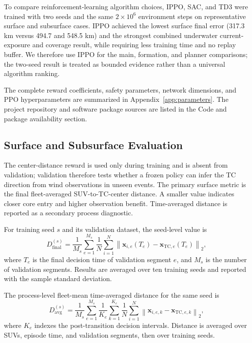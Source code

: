 \documentclass[a4paper,fleqn]{cas-dc}
\begin{document}
To compare reinforcement-learning algorithm choices, IPPO, SAC, and TD3 were
trained with two seeds and the same \(2\times10^6\) environment steps on
representative surface and subsurface cases. IPPO achieved the lowest surface
final error (317.3 km versus 494.7 and 548.5 km) and the strongest combined
underwater current-exposure and coverage result, while requiring less training
time and no replay buffer. We therefore use IPPO for the main, formation, and
planner comparisons; the two-seed result is treated as bounded evidence rather
than a universal algorithm ranking.

The complete reward coefficients, safety parameters, network dimensions, and
PPO hyperparameters are summarized in Appendix~\ref{app:parameters}.
The project repository and software package sources are listed in the Code and
package availability section.

\subsection{Surface and Subsurface Evaluation}
\label{subsec:evaluation}

The center-distance reward is used only during training and is absent from
validation; validation therefore tests whether a frozen policy can infer the
TC direction from wind observations in unseen events. The primary surface
metric is the final fleet-averaged SUV-to-TC-center distance. A smaller value
indicates closer core entry and higher observation benefit. Time-averaged
distance is reported as a secondary process diagnostic.

For training seed \(s\) and its validation dataset, the seed-level value is
\begin{equation}
D_{\mathrm{final}}^{(s)}
=
\frac{1}{M_s}
\sum_{e=1}^{M_s}
\frac{1}{N}
\sum_{i=1}^{N}
\left\|
\mathbf{x}_{i,e}(T_e)
-
\mathbf{x}_{\mathrm{TC},e}(T_e)
\right\|_2,
\label{eq:final_tracking_error}
\end{equation}
where \(T_e\) is the final decision time of validation segment \(e\), and
\(M_s\) is the number of validation segments. Results are averaged over ten
training seeds and reported with the sample standard deviation.

The process-level fleet-mean time-averaged distance for the same seed is
\begin{equation}
D_{\mathrm{avg}}^{(s)}
=
\frac{1}{M_s}
\sum_{e=1}^{M_s}
\frac{1}{K_e}
\sum_{k=1}^{K_e}
\frac{1}{N}
\sum_{i=1}^{N}
\left\|
\mathbf{x}_{i,e,k}
-
\mathbf{x}_{\mathrm{TC},e,k}
\right\|_2,
\label{eq:time_averaged_distance}
\end{equation}
where \(K_e\) indexes the post-transition decision intervals. Distance is
averaged over SUVs, episode time, and validation segments, then over training
seeds.
\end{document}
